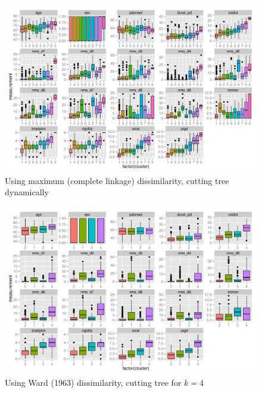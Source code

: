 \documentclass[letterpaper,12pt]{article}
\begin{document}
\begin{figure}[h]
  \centering
  \includegraphics[width=\linewidth]{hc-summaries-complete-dynamic.pdf}
  \caption{Using maximum (complete linkage) dissimilarity, cutting tree
    dynamically}
  \label{fig:hc-summaries-complete-dynamic}
\end{figure}

\begin{figure}[h]
  \centering
  \includegraphics[width=\linewidth]{hc-summaries-ward-D-k4.pdf}
  \caption{Using Ward (1963) dissimilarity, cutting tree for $k = 4$}
  \label{fig:hc-summaries-ward-D-k4}
\end{figure}
\end{document}
